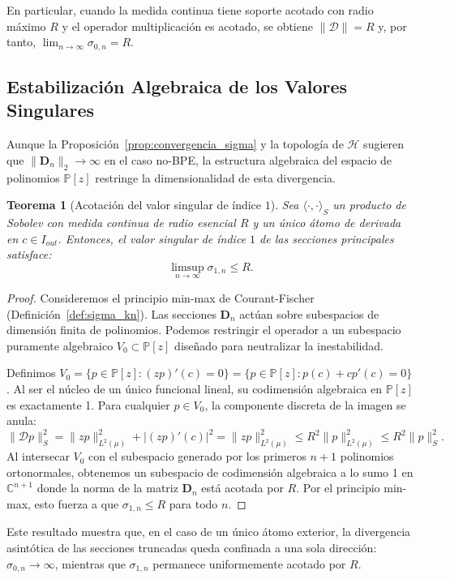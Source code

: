 \documentclass[12pt,a4paper]{article}
\newtheorem{theorem}{Teorema}
\theoremstyle{definition}
\theoremstyle{remark}
\begin{document}
En particular, cuando la medida continua tiene soporte acotado con radio máximo $R$ y el operador multiplicación es acotado, se obtiene $\|\mathcal{D}\| = R$ y, por tanto, $\lim_{n \to \infty} \sigma_{0,n} = R$.

\subsection{Estabilización Algebraica de los Valores Singulares}

Aunque la Proposición~\ref{prop:convergencia_sigma} y la topología de $\mathcal{H}$ sugieren que $\|\mathbf{D}_n\|_2 \to \infty$ en el caso no-BPE, la estructura algebraica del espacio de polinomios $\mathbb{P}[z]$ restringe la dimensionalidad de esta divergencia.

\begin{theorem}[Acotación del valor singular de índice $1$]
	Sea $\langle \cdot, \cdot \rangle_S$ un producto de Sobolev con medida continua de radio esencial $R$ y un único átomo de derivada en $c \in I_{out}$. Entonces, el valor singular de índice $1$ de las secciones principales satisface:
	$$ \limsup_{n \to \infty} \sigma_{1,n} \le R. $$
\end{theorem}

\begin{proof}
	Consideremos el principio min-max de Courant-Fischer (Definición~\ref{def:sigma_kn}). Las secciones $\mathbf{D}_n$ actúan sobre subespacios de dimensión finita de polinomios. Podemos restringir el operador a un subespacio puramente algebraico $V_0 \subset \mathbb{P}[z]$ diseñado para neutralizar la inestabilidad.

	Definimos $V_0 = \{ p \in \mathbb{P}[z] : (zp)'(c) = 0 \} = \{ p \in \mathbb{P}[z] : p(c) + c p'(c) = 0 \}$. Al ser el núcleo de un único funcional lineal, su codimensión algebraica en $\mathbb{P}[z]$ es exactamente 1. Para cualquier $p \in V_0$, la componente discreta de la imagen se anula:
	$$ \|\mathcal{D}p\|_S^2 = \|zp\|_{L^2(\mu)}^2 + |(zp)'(c)|^2 = \|zp\|_{L^2(\mu)}^2 \le R^2 \|p\|_{L^2(\mu)}^2 \le R^2 \|p\|_S^2. $$
	Al intersecar $V_0$ con el subespacio generado por los primeros $n+1$ polinomios ortonormales, obtenemos un subespacio de codimensión algebraica a lo sumo 1 en $\mathbb{C}^{n+1}$ donde la norma de la matriz $\mathbf{D}_n$ está acotada por $R$. Por el principio min-max, esto fuerza a que $\sigma_{1,n} \le R$ para todo $n$.
\end{proof}

Este resultado muestra que, en el caso de un único átomo exterior, la divergencia asintótica de las secciones truncadas queda confinada a una sola dirección: $\sigma_{0,n} \to \infty$, mientras que $\sigma_{1,n}$ permanece uniformemente acotado por $R$.
\end{document}
